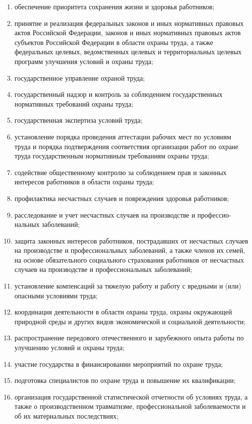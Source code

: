 \begin{enumerate}[1.]
	\item обеспечение приоритета сохранения жизни и здоровья работников;
	\item принятие и реализация федеральных законов и иных нормативных правовых актов Российской Федерации, законов и иных нормативных правовых актов субъектов Российской Федерации в области охраны труда, а также федеральных целевых, ведомственных целевых и территориальных целевых программ улучшения условий и охраны труда;
	\item государственное управление охраной труда;
	\item государственный надзор и контроль за соблюдением государственных нормативных требований охраны труда;
	\item государственная экспертиза условий труда;
	\item установление порядка проведения аттестации рабочих мест по условиям труда и порядка подтверждения соответствия организации работ по охране труда государственным нормативным требованиям охраны труда;
	\item содействие общественному контролю за соблюдением прав и законных интересов работников в области охраны труда;
	\item профилактика несчастных случаев и повреждения здоровья работников;
	\item расследование и учет несчастных случаев на производстве и профессио-нальных заболеваний;
	\item защита законных интересов работников, пострадавших от несчастных случаев на производстве и профессиональных заболеваний, а также членов их семей, на основе обязательного социального страхования работников от несчастных случаев на производстве и профессиональных заболеваний;
	\item установление компенсаций за тяжелую работу и работу с вредными и (или) опасными условиями труда;
	\item координация деятельности в области охраны труда, охраны окружающей природной среды и других видов экономической и социальной деятельности;
	\item распространение передового отечественного и зарубежного опыта работы по улучшению условий и охраны труда;
	\item участие государства в финансировании мероприятий по охране труда;
	\item подготовка специалистов по охране труда и повышение их квалификации;
	\item организация государственной статистической отчетности об условиях труда, а также о производственном травматизме, профессиональной заболеваемости и об их материальных последствиях;

\end{enumerate}
